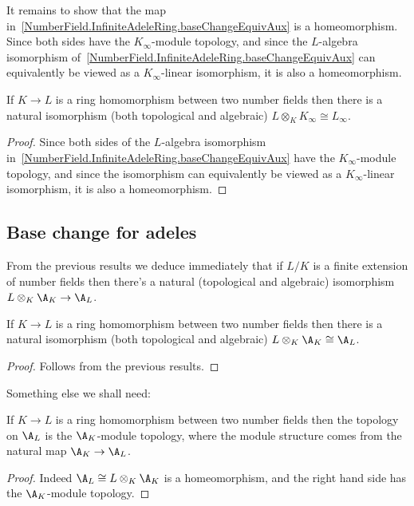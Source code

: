 It remains to show that the map in~\ref{NumberField.InfiniteAdeleRing.baseChangeEquivAux} is a
homeomorphism.
Since both sides have the $K_{\infty}$-module topology, and since the $L$-algebra isomorphism
of~\ref{NumberField.InfiniteAdeleRing.baseChangeEquivAux} can equivalently be viewed as a
$K_{\infty}$-linear isomorphism, it is also a homeomorphism.

\begin{theorem}
  \label{NumberField.InfiniteAdeleRing.baseChangeEquiv}
  \leanok
  If $K\to L$ is a ring homomorphism between two number fields then there is a natural isomorphism
  (both topological and algebraic) $L\otimes_KK_\infty\cong L_\infty$.
\end{theorem}
\begin{proof}
  Since both sides of the $L$-algebra isomorphism
  in~\ref{NumberField.InfiniteAdeleRing.baseChangeEquivAux} have the $K_{\infty}$-module topology,
  and since the isomorphism can equivalently be viewed as a $K_{\infty}$-linear isomorphism,
  it is also a homeomorphism.
\end{proof}


\subsection{Base change for adeles}

From the previous results we deduce immediately that if $L/K$ is a finite extension
of number fields then there's a natural (topological and algebraic) isomorphism
$L\otimes_K\A_K\to \A_L$.

\begin{theorem}
  \label{NumberField.AdeleRing.baseChangeEquiv}
  \leanok
  If $K\to L$ is a ring homomorphism between two number fields then there is a natural isomorphism
  (both topological and algebraic) $L\otimes_K\A_K\cong\A_L$.
\end{theorem}
\begin{proof}
  \leanok
  Follows from the previous results.
\end{proof}

Something else we shall need:

\begin{theorem}
  \label{NumberField.AdeleRing.baseChange_moduleTopology}
  \leanok
  If $K\to L$ is a ring homomorphism between two number fields then the topology on $\A_L$
  is the $\A_K$-module topology, where the module structure comes from the
  natural map $\A_K\to\A_L$.
\end{theorem}
\begin{proof}
  \leanok
  Indeed $\A_L\cong L\otimes_K\A_K$ is a homeomorphism, and
  the right hand side has the $\A_K$-module topology.
\end{proof}

